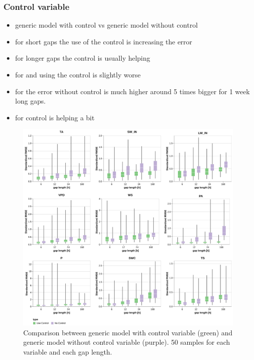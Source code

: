 \documentclass{article}
\newcommand{\imgwidth}{6in}
\begin{document}
\subsubsection{Control variable}

\begin{itemize}
    \item generic model with control vs generic model without control
    \item for short gaps the use of the control is increasing the error
    \item for longer gaps the control is usually helping
    \item for  and  using the control is slightly worse
    \item for  the error without control is much higher around 5 times bigger for 1 week long gaps.
    \item for  control is helping a bit
\end{itemize}



\begin{figure}
\centerline{\includegraphics[width=\imgwidth]{images2/use_control.png}}
\caption{Comparison between generic model with control variable (green) and generic model without control variable (purple). 50 samples for each variable and each gap length.}
\label{fig:control}
\end{figure}
\end{document}
